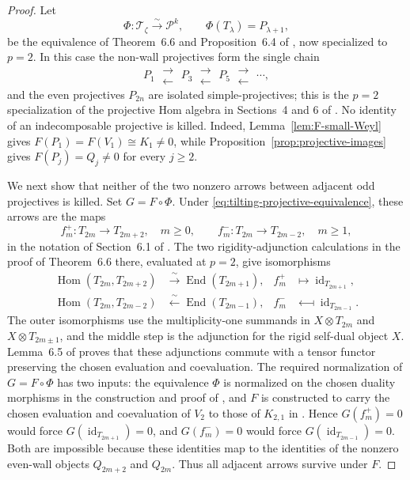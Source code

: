 \documentclass[12pt,leqno]{amsart}
\numberwithin{equation}{section}
\newcommand{\End}{\operatorname{End}}
\newcommand{\Hom}{\operatorname{Hom}}
\newcommand{\id}{\operatorname{id}}
\begin{document}
\begin{proof}
Let
\[
 \Phi:\mathcal T_\zeta\xrightarrow{\sim}\mathcal P^k,
 \qquad \Phi(T_\lambda)=P_{\lambda+1},
\]
be the equivalence of Theorem~6.6 and Proposition~6.4 of
\cite{McRaeYang}, now specialized to $p=2$.  In this case the non-wall
projectives form the single chain
\[
 P_1\;\substack{\longrightarrow\\[-3pt]\longleftarrow}\;
 P_3\;\substack{\longrightarrow\\[-3pt]\longleftarrow}\;
 P_5\;\substack{\longrightarrow\\[-3pt]\longleftarrow}\;\cdots,
\]
and the even projectives $P_{2n}$ are isolated simple-projectives; this is
the $p=2$ specialization of the projective Hom algebra in Sections~4 and 6
of \cite{McRaeYang}.  No identity of an indecomposable projective is
killed.  Indeed, Lemma~\ref{lem:F-small-Weyl} gives
$F(P_1)=F(V_1)\cong K_1\neq0$, while
Proposition~\ref{prop:projective-images} gives $F(P_j)=Q_j\neq0$ for every
$j\geq2$.

We next show that neither of the two nonzero arrows between adjacent odd
projectives is killed.  Set $G=F\circ\Phi$.  Under
\eqref{eq:tilting-projective-equivalence}, these arrows are the maps
\[
 f_m^+:T_{2m}\longrightarrow T_{2m+2},
 \quad m\geq0,
 \qquad
 f_m^-:T_{2m}\longrightarrow T_{2m-2},
 \quad m\geq1,
\]
in the notation of Section~6.1 of \cite{McRaeYang}.  The two
rigidity-adjunction calculations in the proof of Theorem~6.6 there,
evaluated at $p=2$, give isomorphisms
\begin{align*}
 \Hom(T_{2m},T_{2m+2})
 &\xrightarrow{\ \sim\ }\End(T_{2m+1}),
 &f_m^+&\longmapsto\id_{T_{2m+1}},\\
 \Hom(T_{2m},T_{2m-2})
 &\xleftarrow{\ \sim\ }\End(T_{2m-1}),
 &f_m^-&\longmapsfrom\id_{T_{2m-1}}.
\end{align*}
The outer isomorphisms use the multiplicity-one summands in
$X\otimes T_{2m}$ and $X\otimes T_{2m\pm1}$, and the middle step is the
adjunction for the rigid self-dual object $X$.  Lemma~6.5 of
\cite{McRaeYang} proves that these adjunctions commute with a tensor
functor preserving the chosen evaluation and coevaluation.  The required
normalization of $G=F\circ\Phi$ has two inputs: the equivalence $\Phi$ is
normalized on the chosen duality morphisms in the construction and proof
of \cite[Theorem~6.6]{McRaeYang}, and $F$ is constructed to carry the chosen
evaluation and coevaluation of $V_2$ to those of $K_{2,1}$ in
\cite[Theorem~7.15]{McRaeYang}.  Hence $G(f_m^+)=0$ would force
$G(\id_{T_{2m+1}})=0$, and $G(f_m^-)=0$ would force
$G(\id_{T_{2m-1}})=0$.  Both are impossible because these identities map
to the identities of the nonzero even-wall objects $Q_{2m+2}$ and
$Q_{2m}$.  Thus all adjacent arrows survive under $F$.


\end{proof}
\end{document}
